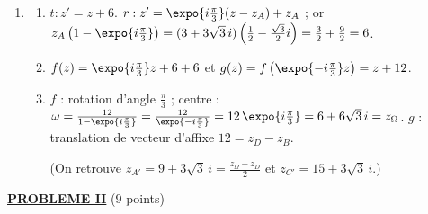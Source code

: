 \begin{description}
\begin{enumerate}
		\item
		\begin{enumerate}
			\item {}
				$t : z' = z + 6$. $r : z' = \expo{i\frac{\pi}{3}}(z - z_A) + z_A$ ; or $z_A\left(1 - \expo{i\frac{\pi}{3}}\right) = (3 + 3\sqrt{3}\,i)\left(\frac{1}{2} - \frac{\sqrt{3}}{2}i\right) = \frac{3}{2} + \frac{9}{2} = 6$.
				\par\noindent{}
			\item {}
				$f(z) = \expo{i\frac{\pi}{3}}z + 6 + 6$ et $g(z) = f\left(\expo{-i\frac{\pi}{3}}z\right) = z + 12$.
				\par\noindent{}
			\item {}
				$f$ : rotation d'angle $\frac{\pi}{3}$ ; centre : $\omega = \frac{12}{1 - \expo{i\frac{\pi}{3}}} = \frac{12}{\expo{-i\frac{\pi}{3}}} = 12\,\expo{i\frac{\pi}{3}} = 6 + 6\sqrt{3}\,i = z_\Omega$.
				$g$ : translation de vecteur d'affixe $12 = z_D - z_B$.
				\par\noindent{}
				(On retrouve $z_{A'} = 9 + 3\sqrt{3}\,i = \frac{z_\Omega + z_D}{2}$ et $z_{C'} = 15 + 3\sqrt{3}\,i$.)
		\end{enumerate}
	\end{enumerate}
\end{description}
\noindent \underline{\textsc{\textbf{PROBLEME II}}} (9 points)
